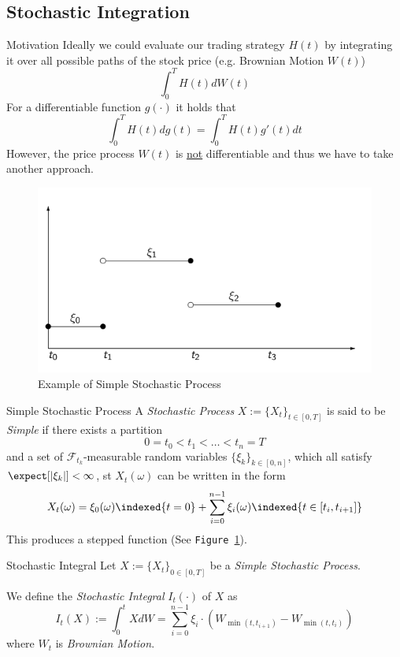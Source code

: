 \documentclass[11pt,a4paper]{article}
\begin{document}
\subsection{Stochastic Integration}

  \begin{remark}{Motivation}
    Ideally we could evaluate our trading strategy $H(t)$ by integrating it over all possible paths of the stock price (e.g. Brownian Motion $W(t)$)
    \[ \int_0^TH(t)dW(t) \]
    For a differentiable function $g(\cdot)$ it holds that
    \[ \int_0^TH(t)dg(t)=\int_0^TH(t)g'(t)dt \]
    However, the price process $W(t)$ is \underline{not} differentiable and thus we have to take another approach.
  \end{remark}

  \begin{figure}[H]
    \centering\includegraphics[width=.7\textwidth]{SimpleStochasticProcess.PNG}
    \caption{Example of Simple Stochastic Process}
    \label{fig_simple_stochastic_process}
  \end{figure}

  \begin{definition}{Simple Stochastic Process}
    A \textit{Stochastic Process} $X:=\{X_t\}_{t\in[0,T]}$ is said to be \textit{Simple} if there exists a partition
    \[ 0=t_0<t_1<\dots<t_n=T \] and a set of $\mathcal{F}_{t_k}$-measurable random variables $\{\xi_k\}_{k\in[0,n]}$, which all satisfy $\expect[|\xi_k|]<\infty$, st $X_t(\omega)$ can be written in the form
    \[ X_t(\omega)=\xi_0(\omega)\indexed\{t=0\}+\sum_{i=0}^{n-1}\xi_i(\omega)\indexed\{t\in[t_i,t_{i+1}]\} \]
    This produces a stepped function (See \texttt{Figure \ref{fig_simple_stochastic_process}}).
  \end{definition}

  \begin{definition}{Stochastic Integral}
    Let $X:=\{X_t\}_{0\in[0,T]}$ be a \textit{Simple Stochastic Process}.
    \par We define the \textit{Stochastic Integral} $I_t(\cdot)$ of $X$ as
    \[ I_t(X):=\int_0^tXdW=\sum_{i=0}^{n-1}\xi_i\cdot\left(W_{\min(t,t_{i+1})}-W_{\min(t,t_i)}\right) \]
    where $W_t$ is \textit{Brownian Motion}.
  \end{definition}
\end{document}
